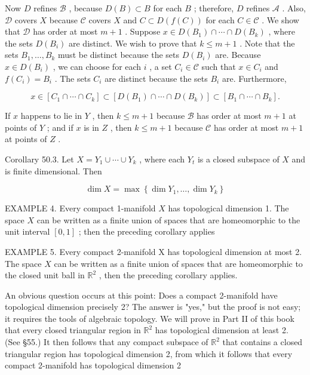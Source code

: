 \documentclass[10pt]{article}
\begin{document}
Now \(D\) refines \(\mathcal{B}\) , because \(D\left( B\right)  \subset  B\) for each \(B\) ; therefore, \(D\) refines \(\mathcal{A}\) . Also, \(\mathcal{D}\) covers \(X\) because \(\mathcal{C}\) covers \(X\) and \(C \subset  D\left( {f\left( C\right) }\right)\) for each \(C \in  \mathcal{C}\) . We show that \(\mathcal{D}\) has order at most \(m + 1\) . Suppose \(x \in  D\left( {B}_{1}\right)  \cap  \cdots  \cap  D\left( {B}_{k}\right)\) , where the sets \(D\left( {B}_{i}\right)\) are distinct. We wish to prove that \(k \leq  m + 1\) . Note that the sets \({B}_{1},\ldots ,{B}_{k}\) must be distinct because the sets \(D\left( {B}_{i}\right)\) are. Because \(x \in  D\left( {B}_{i}\right)\) , we can choose for each \(i\) , a set \({C}_{i} \in  \mathcal{C}\) such that \(x \in  {C}_{i}\) and \(f\left( {C}_{i}\right)  = {B}_{i}\) . The sets \({C}_{i}\) are distinct because the sets \({B}_{i}\) are. Furthermore,

\[
x \in  \left\lbrack  {{C}_{1} \cap  \cdots  \cap  {C}_{k}}\right\rbrack   \subset  \left\lbrack  {D\left( {B}_{1}\right)  \cap  \cdots  \cap  D\left( {B}_{k}\right) }\right\rbrack   \subset  \left\lbrack  {{B}_{1} \cap  \cdots  \cap  {B}_{k}}\right\rbrack  .
\]

If \(x\) happens to lie in \(Y\) , then \(k \leq  m + 1\) because \(\mathcal{B}\) has order at most \(m + 1\) at points of \(Y\) ; and if \(x\) is in \(Z\) , then \(k \leq  m + 1\) because \(\mathcal{C}\) has order at most \(m + 1\) at points of \(Z\) .

Corollary 50.3. Let \(X = {Y}_{1} \cup  \cdots  \cup  {Y}_{k}\) , where each \({Y}_{t}\) is a closed subspace of \(X\) and is finite dimensional. Then

\[
\dim X = \max \left\{  {\dim {Y}_{1},\ldots ,\dim {Y}_{k}}\right\}
\]

EXAMPLE 4. Every compact 1-manifold \(X\) has topological dimension 1. The space \(X\) can be written as a finite union of spaces that are homeomorphic to the unit interval \(\left\lbrack  {0,1}\right\rbrack\) ; then the preceding corollary applies

EXAMPLE 5. Every compact 2-manifold X has topological dimension at most 2. The space \(X\) can be written as a finite union of spaces that are homeomorphic to the closed unit ball in \({\mathbb{R}}^{2}\) , then the preceding corollary applies.

An obvious question occurs at this point: Does a compact 2-manifold have topological dimension precisely 2? The answer is "yes," but the proof is not easy; it requires the tools of algebraic topology. We will prove in Part II of this book that every closed triangular region in \({\mathbb{R}}^{2}\) has topological dimension at least 2. (See §55.) It then follows that any compact subspace of \({\mathbb{R}}^{2}\) that contains a closed triangular region has topological dimension 2, from which it follows that every compact 2-manifold has topological dimension 2
\end{document}
